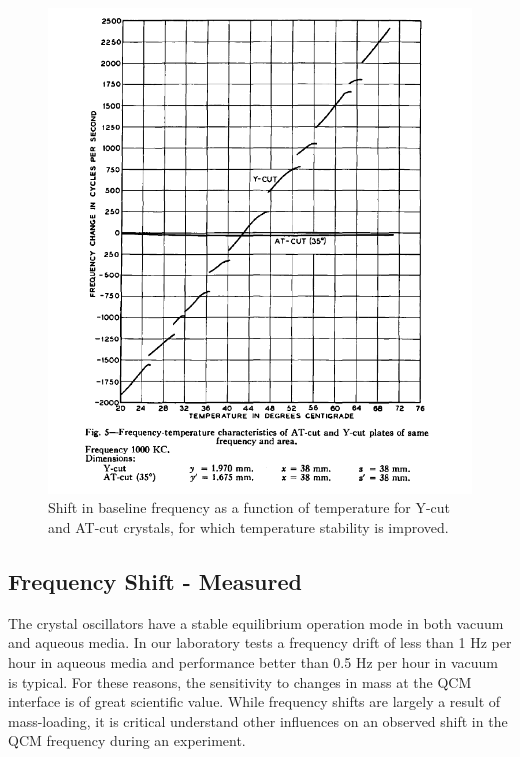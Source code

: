 \begin{figure}[hbtp]
	\centering
	\includegraphics[width=1.0\textwidth]{Chapter-2/fig4_df_vs_T_for_AT_and_Y_cuts}
	\caption{Shift in baseline frequency as a function of temperature for Y-cut and AT-cut crystals, for which temperature stability is improved.\cite{211}}
	\label{fig4:df vs T}
\end{figure}



\subsection{Frequency Shift - Measured}



The crystal oscillators have a stable equilibrium operation mode in both vacuum and aqueous media. In our laboratory tests a frequency drift of less than 1 Hz per hour in aqueous media and performance better than 0.5 Hz per hour in vacuum is typical. For these reasons, the sensitivity to changes in mass at the QCM interface is of great scientific value. While frequency shifts are largely a result of mass-loading, it is critical understand other influences on an observed shift in the QCM frequency during an experiment.



